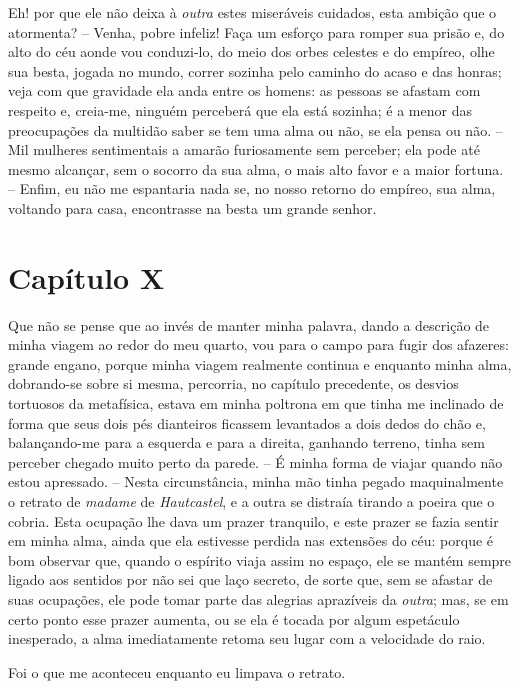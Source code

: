  Eh! por que ele não deixa à \textit{outra} estes miseráveis cuidados,
esta ambição que o atormenta? -- Venha, pobre infeliz! Faça um esforço
para romper sua prisão e, do alto do céu aonde vou conduzi-lo, do meio
dos orbes celestes e do empíreo, olhe sua besta, jogada no mundo,
correr sozinha pelo caminho do acaso e das honras; veja com que
gravidade ela anda entre os homens: as pessoas se afastam com respeito
e, creia-me, ninguém perceberá que ela está sozinha; é a menor das
preocupações da multidão saber se tem uma alma ou não, se ela pensa ou
não. -- Mil mulheres sentimentais a amarão furiosamente sem perceber;
ela pode até mesmo alcançar, sem o socorro da sua alma, o mais alto
favor e a maior fortuna. -- Enfim, eu não me espantaria nada se, no
nosso retorno do empíreo, sua alma, voltando para casa, encontrasse na
besta um grande senhor. 

\section{Capítulo X}

 Que não se pense que ao invés de manter minha palavra, dando a
descrição de minha viagem ao redor do meu quarto, vou para o campo para
fugir dos afazeres: grande engano, porque minha viagem realmente
continua e enquanto minha alma, dobrando-se sobre si mesma, percorria,
no capítulo precedente, os desvios tortuosos da metafísica, estava em
minha poltrona em que tinha me inclinado de forma que seus dois pés
dianteiros ficassem levantados a dois dedos do chão e, balançando-me
para a esquerda e para a direita, ganhando terreno, tinha sem perceber
chegado muito perto da parede. -- É minha forma de viajar quando não
estou apressado. -- Nesta circunstância, minha mão tinha pegado
maquinalmente o retrato de \textit{madame} de \textit{Hautcastel}, e a
outra se distraía tirando a poeira que o cobria. Esta ocupação lhe dava
um prazer tranquilo, e este prazer se fazia sentir em minha alma, ainda
que ela estivesse perdida nas extensões do céu: porque é bom observar
que, quando o espírito viaja assim no espaço, ele se mantém sempre
ligado aos sentidos por não sei que laço secreto, de sorte que, sem se
afastar de suas ocupações, ele pode tomar parte das alegrias aprazíveis
da \textit{outra}; mas, se em certo ponto esse prazer aumenta, ou se
ela é tocada por algum espetáculo inesperado, a alma imediatamente
retoma seu lugar com a velocidade do raio. 

 Foi o que me aconteceu enquanto eu limpava o retrato.

